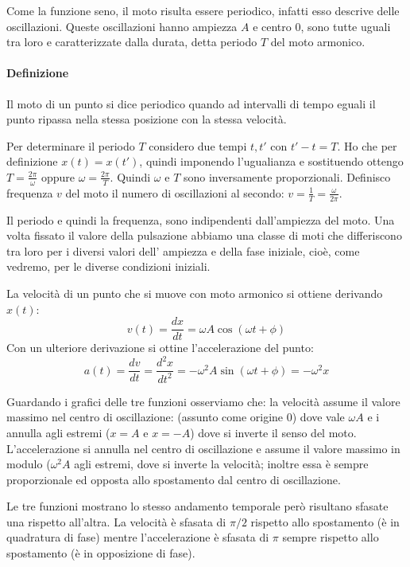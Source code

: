 \documentclass[class=book, crop=false, oneside, 12pt]{standalone}
\begin{document}
Come la funzione seno, il moto risulta essere periodico, infatti esso descrive delle oscillazioni.
Queste oscillazioni hanno ampiezza \(A\) e centro \(0\), sono tutte uguali tra loro e caratterizzate dalla durata, detta periodo \(T\) del moto armonico.
\paragraph{Definizione}
Il moto di un punto si dice periodico quando ad intervalli di tempo eguali il punto ripassa nella stessa posizione con la stessa velocità.

Per determinare il periodo \(T\) considero due tempi \(t,t'\) con \(t'-t = T\).
Ho che per definizione \(x(t) = x(t')\), quindi imponendo l'ugualianza e sostituendo ottengo \(T = \frac {2 \pi} {\omega}\) oppure \(\omega = \frac{2 \pi}{T}\).
Quindi \(\omega\) e \(T\) sono inversamente proporzionali.
Definisco frequenza \(v\) del moto il numero di oscillazioni al secondo:
\(v = \frac{1}{T} = \frac{\omega}{2 \pi}\).

Il periodo e quindi la frequenza, sono indipendenti dall'ampiezza del moto.
Una volta fissato il valore della pulsazione abbiamo una classe di moti 
che differiscono tra loro per i diversi valori dell' ampiezza e della fase iniziale, cioè, come vedremo, per le diverse condizioni iniziali.

La velocità di un punto che si muove con moto armonico si ottiene derivando \(x(t)\):
\begin{equation}
  v(t) = \frac{dx}{dt} = \omega A \cos (\omega t + \phi)
\end{equation}
Con un ulteriore derivazione si ottine l'accelerazione del punto:
\begin{equation}
  a(t) = \frac{dv}{dt} = \frac{d^2 x}{dt^2} = -\omega^2 A \sin (\omega t + \phi) = -\omega^2 x
\end{equation}

Guardando i grafici delle tre funzioni osserviamo che: 
la velocità assume il valore massimo nel centro di oscillazione: (assunto come origine 0) dove vale \(\omega A\) e i annulla agli estremi (\(x =A\) e \(x =-A\)) dove si inverte il senso del moto. 
L'accelerazione si annulla nel centro di oscillazione e assume il valore massimo in modulo (\(\omega^2 A\) agli estremi, dove si inverte la velocità; inoltre essa è sempre proporzionale ed opposta allo spostamento dal centro di oscillazione. 

Le tre funzioni mostrano lo stesso andamento temporale però risultano sfasate una rispetto all'altra.
La velocità è sfasata di \(\pi / 2\) rispetto allo spostamento (è in quadratura di fase) mentre l'accelerazione è sfasata di \(\pi\) sempre rispetto allo spostamento (è in opposizione di fase).
\end{document}
